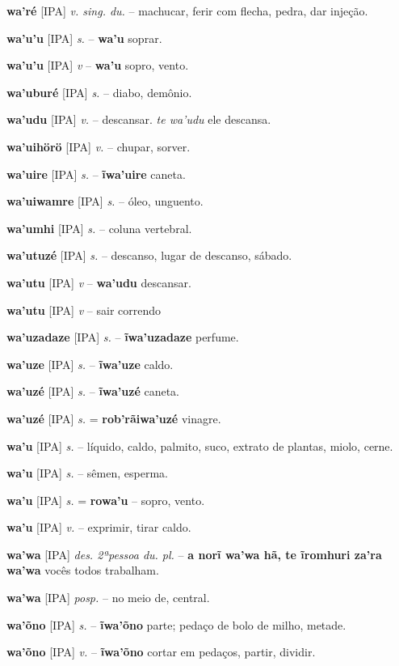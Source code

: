 \textbf{wa'ré} [IPA] \textit{v. sing. du.} -- machucar, ferir com flecha, pedra, dar injeção.

\textbf{wa'u'u} [IPA] \textit{s.} -- \textbf{wa'u} soprar.

\textbf{wa'u'u} [IPA] \textit{v} -- \textbf{wa'u} sopro, vento.

\textbf{wa'uburé} [IPA] \textit{s.} -- diabo, demônio.

\textbf{wa'udu} [IPA] \textit{v.} -- descansar. \textit{te wa'udu} ele descansa.

\textbf{wa'uihörö} [IPA] \textit{v.} -- chupar, sorver.

\textbf{wa'uire} [IPA] \textit{s.} -- \textbf{ĩwa'uire} caneta.

\textbf{wa'uiwamre} [IPA] \textit{s.} -- óleo, unguento.

\textbf{wa'umhi} [IPA] \textit{s.} -- coluna vertebral.

\textbf{wa'utuzé} [IPA] \textit{s.} -- descanso, lugar de descanso, sábado.

\textbf{wa'utu} [IPA] \textit{v} -- \textbf{wa'udu} descansar.

\textbf{wa'utu} [IPA] \textit{v} -- {sair correndo}

\textbf{wa'uzadaze} [IPA] \textit{s.} -- \textbf{ĩwa'uzadaze} perfume.

\textbf{wa'uze} [IPA] \textit{s.} -- \textbf{ĩwa'uze} caldo.

\textbf{wa'uzé} [IPA] \textit{s.} -- \textbf{ĩwa'uzé} caneta.

\textbf{wa'uzé} [IPA] \textit{s.} = \textbf{rob'rãiwa'uzé} vinagre.

\textbf{wa'u} [IPA] \textit{s.} -- líquido, caldo, palmito, suco, extrato de plantas, miolo, cerne.

\textbf{wa'u} [IPA] \textit{s.} -- sêmen, esperma.

\textbf{wa'u} [IPA] \textit{s.} = \textbf{rowa'u} -- sopro, vento.

\textbf{wa'u} [IPA] \textit{v.} -- exprimir, tirar caldo.

\textbf{wa'wa} [IPA] \textit{des. 2ªpessoa du. pl.} -- \textbf{a norĩ wa'wa hã, te ĩromhuri za'ra wa'wa} vocês todos trabalham.

\textbf{wa'wa} [IPA] \textit{posp.} -- no meio de, central.

\textbf{wa'õno} [IPA] \textit{s.} -- \textbf{ĩwa'õno} parte; pedaço de bolo de milho, metade.

\textbf{wa'õno} [IPA] \textit{v.} -- \textbf{ĩwa'õno} cortar em pedaços, partir, dividir.

